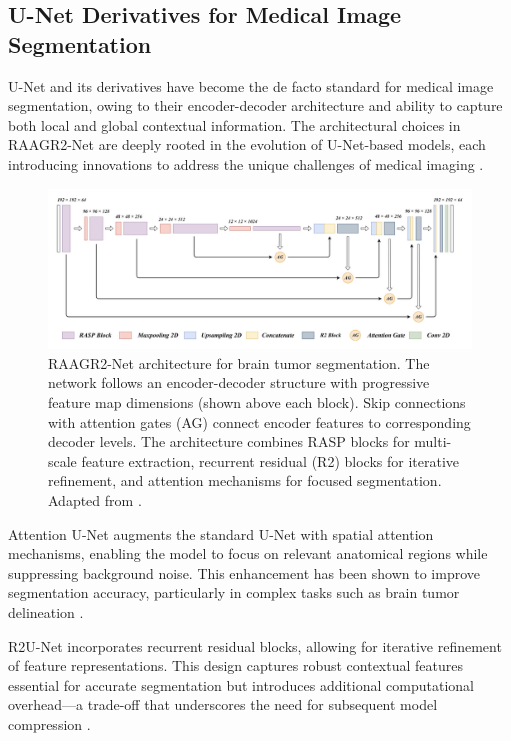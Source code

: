 \documentclass[12pt,a4paper]{article}
\begin{document}
\subsection{U-Net Derivatives for Medical Image Segmentation}

U-Net and its derivatives have become the de facto standard for medical image segmentation, owing to their encoder-decoder architecture and ability to capture both local and global contextual information. The architectural choices in RAAGR2-Net are deeply rooted in the evolution of U-Net-based models, each introducing innovations to address the unique challenges of medical imaging \cite{Abidin2024, Wang2023Review}.

\begin{figure}[H]
\centering
\includegraphics[width=\textwidth]{raagnet_structure.png}
\caption{RAAGR2-Net architecture for brain tumor segmentation. The network follows an encoder-decoder structure with progressive feature map dimensions (shown above each block). Skip connections with attention gates (AG) connect encoder features to corresponding decoder levels. The architecture combines RASP blocks for multi-scale feature extraction, recurrent residual (R2) blocks for iterative refinement, and attention mechanisms for focused segmentation. Adapted from \cite{Rehman2023RAAGR2}.}
\label{fig:unet_evolution}
\end{figure}

Attention U-Net augments the standard U-Net with spatial attention mechanisms, enabling the model to focus on relevant anatomical regions while suppressing background noise. This enhancement has been shown to improve segmentation accuracy, particularly in complex tasks such as brain tumor delineation \cite{Oktay2018AttentionUNet, Abidin2024}.

R2U-Net incorporates recurrent residual blocks, allowing for iterative refinement of feature representations. This design captures robust contextual features essential for accurate segmentation but introduces additional computational overhead—a trade-off that underscores the need for subsequent model compression \cite{Alom2019R2UNet, Abidin2024}.
\end{document}
